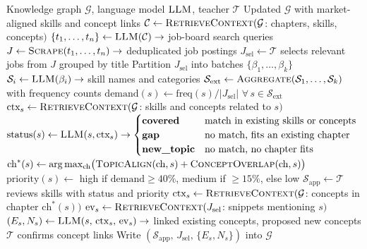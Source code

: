 \begin{algorithm}[t]
\caption{Multi-Agent Curriculum Gap Analysis}
\label{alg:market-demand-analyst}
\begin{algorithmic}[1]
\Require Knowledge graph $\mathcal{G}$, language model $\textsc{LLM}$, teacher $\mathcal{T}$
\Ensure Updated $\mathcal{G}$ with market-aligned skills and concept links
\Statex
\State $\mathcal{C} \leftarrow \textsc{RetrieveContext}(\mathcal{G}$: chapters, skills, concepts$)$
\State $\{t_1,\dots,t_n\} \leftarrow \textsc{LLM}(\mathcal{C}) \to$ job-board search queries
\State $J \leftarrow \textsc{Scrape}(t_1,\dots,t_n) \to$ deduplicated job postings
\State $J_\text{sel} \leftarrow \mathcal{T}$ selects relevant jobs from $J$ grouped by title
\Statex
\State Partition $J_\text{sel}$ into batches $\{\beta_1,\dots,\beta_k\}$
  \State $\mathcal{S}_i \leftarrow \textsc{LLM}(\beta_i) \to$ skill names and categories
\EndFor
\State $\mathcal{S}_\text{ext} \leftarrow \textsc{Aggregate}(\mathcal{S}_1,\dots,\mathcal{S}_k)$ with frequency counts
\State $\text{demand}(s) \leftarrow \text{freq}(s) / |J_\text{sel}|$ \quad $\forall\, s \in \mathcal{S}_\text{ext}$
\Statex
{}
  \State $\text{ctx}_s \leftarrow \textsc{RetrieveContext}(\mathcal{G}$: skills and concepts related to $s)$
  \State $\text{status}(s) \leftarrow \textsc{LLM}(s, \text{ctx}_s) \to \begin{cases}
    \textbf{covered} & \text{match in existing skills or concepts} \\
    \textbf{gap} & \text{no match, fits an existing chapter} \\
    \textbf{new\_topic} & \text{no match, no chapter fits}
  \end{cases}$
    \State $\text{ch}^*(s) \leftarrow \arg\max_\text{ch}\bigl(\textsc{TopicAlign}(\text{ch},s) + \textsc{ConceptOverlap}(\text{ch},s)\bigr)$
    \State $\text{priority}(s) \leftarrow$ high if $\text{demand} \geq 40\%$, medium if $\geq 15\%$, else low
  \EndIf
\EndFor
\Statex
\State $\mathcal{S}_\text{app} \leftarrow \mathcal{T}$ reviews skills with status and priority
  \State $\text{ctx}_s \leftarrow \textsc{RetrieveContext}(\mathcal{G}$: concepts in chapter $\text{ch}^*(s))$
  \State $\text{ev}_s \leftarrow \textsc{RetrieveContext}(J_\text{sel}$: snippets mentioning $s)$
  \State $(E_s, N_s) \leftarrow \textsc{LLM}(s,\, \text{ctx}_s,\, \text{ev}_s) \to$ linked existing concepts, proposed new concepts
\EndFor
\State $\mathcal{T}$ confirms concept links
\State Write $(\mathcal{S}_\text{app},\, J_\text{sel},\, \{E_s, N_s\})$ into $\mathcal{G}$
\end{algorithmic}
\end{algorithm}
